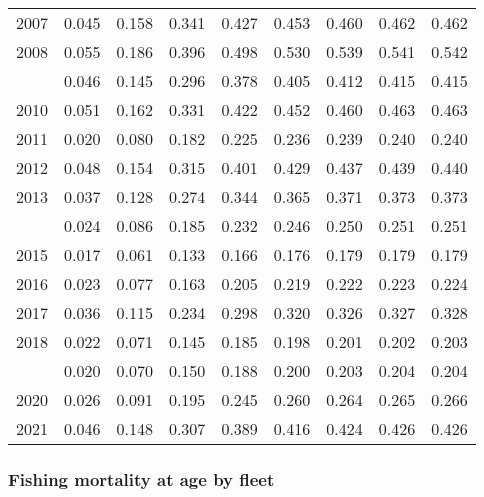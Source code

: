 \documentclass[
]{article}
\begin{document}
\begin{longtable}[t]{lrrrrrrrr}
2007 & 0.045 & 0.158 & 0.341 & 0.427 & 0.453 & 0.460 & 0.462 & 0.462\\
2008 & 0.055 & 0.186 & 0.396 & 0.498 & 0.530 & 0.539 & 0.541 & 0.542\\
\addlinespace
2009 & 0.046 & 0.145 & 0.296 & 0.378 & 0.405 & 0.412 & 0.415 & 0.415\\
2010 & 0.051 & 0.162 & 0.331 & 0.422 & 0.452 & 0.460 & 0.463 & 0.463\\
2011 & 0.020 & 0.080 & 0.182 & 0.225 & 0.236 & 0.239 & 0.240 & 0.240\\
2012 & 0.048 & 0.154 & 0.315 & 0.401 & 0.429 & 0.437 & 0.439 & 0.440\\
2013 & 0.037 & 0.128 & 0.274 & 0.344 & 0.365 & 0.371 & 0.373 & 0.373\\
\addlinespace
2014 & 0.024 & 0.086 & 0.185 & 0.232 & 0.246 & 0.250 & 0.251 & 0.251\\
2015 & 0.017 & 0.061 & 0.133 & 0.166 & 0.176 & 0.179 & 0.179 & 0.179\\
2016 & 0.023 & 0.077 & 0.163 & 0.205 & 0.219 & 0.222 & 0.223 & 0.224\\
2017 & 0.036 & 0.115 & 0.234 & 0.298 & 0.320 & 0.326 & 0.327 & 0.328\\
2018 & 0.022 & 0.071 & 0.145 & 0.185 & 0.198 & 0.201 & 0.202 & 0.203\\
\addlinespace
2019 & 0.020 & 0.070 & 0.150 & 0.188 & 0.200 & 0.203 & 0.204 & 0.204\\
2020 & 0.026 & 0.091 & 0.195 & 0.245 & 0.260 & 0.264 & 0.265 & 0.266\\
2021 & 0.046 & 0.148 & 0.307 & 0.389 & 0.416 & 0.424 & 0.426 & 0.426\\*
\end{longtable}

\hypertarget{fishing-mortality-at-age-by-fleet}{%
\subsubsection{Fishing mortality at age by
fleet}\label{fishing-mortality-at-age-by-fleet}}
\end{document}
